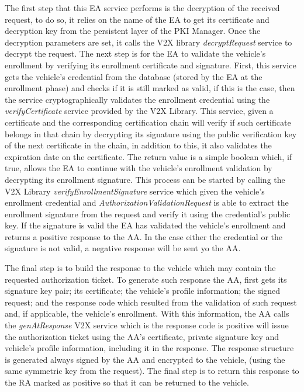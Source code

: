 The first step that this EA service performs is the decryption of the received request, to do so, it relies on the name of the EA to get its certificate and decryption key from the persistent layer of the PKI Manager. Once the decryption parameters are set, it calls the V2X library \textit{decryptRequest} service to decrypt the request. The next step is for the EA to validate the vehicle's enrollment by verifying its enrollment certificate and signature. First, this service gets the vehicle's credential from the database (stored by the EA at the enrollment phase) and checks if it is still marked as valid, if this is the case, then the service cryptographically validates the enrollment credential using the \textit{verifyCertificate} service provided by the V2X Library. This service, given a certificate and the corresponding certification chain will verify if such certificate belongs in that chain by decrypting its signature using the public verification key of the next certificate in the chain, in addition to this, it also validates the expiration date on the certificate. The return value is a simple boolean which, if true, allows the EA to continue with the vehicle's enrollment validation by decrypting its enrollment signature. This process can be started by calling the V2X Library \textit{verifyEnrollmentSignature} service which given the vehicle's enrollment credential and \textit{AuthorizationValidationRequest} is able to extract the enrollment signature from the request and verify it using the credential's public key. If the signature is valid the EA has validated the vehicle's enrollment and returns a positive response to the AA. In the case either the credential or the signature is not valid, a negative response will be sent yo the AA. 

The final step is to build the response to the vehicle which may contain the requested authorization ticket. To generate such response the AA, first gets its signature key pair; its certificate; the vehicle's profile information; the signed request; and the response code which resulted from the validation of such request and, if applicable, the vehicle's enrollment. With this information, the AA calls the \textit{genAtResponse} V2X service which is the response code is positive will issue the authorization ticket using the AA's certificate, private signature key and vehicle's profile information, including it in the response. The response structure is generated always signed by the AA and encrypted to the vehicle, (using the same symmetric key from the request). The final step is to return this response to the RA marked as positive so that it can be returned to the vehicle.


